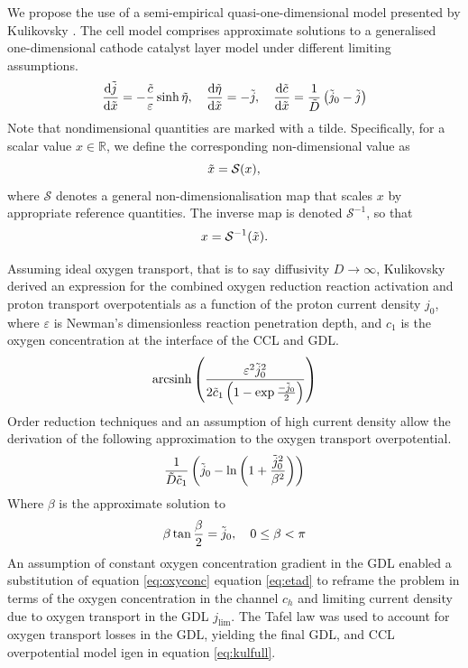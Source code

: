 We propose the use of a semi-empirical quasi-one-dimensional model presented by Kulikovsky \cite{kulikovskyPhysicallyBasedAnalytical2013a}.
The cell model comprises approximate solutions to a generalised one-dimensional cathode catalyst layer model under different limiting assumptions.
\begin{equation}
	\frac{\text{d} \tilde{j}}{\text{d} \tilde{x}}      = -\frac{\tilde{c}}{\varepsilon}\sinh{\tilde{\eta}}, \quad
	\frac{\text{d} \tilde{\eta}}{\text{d} \tilde{x}}  = -\tilde{j}, \quad
	\frac{\text{d} \tilde{c}}{\text{d} \tilde{x}}      = \frac{1}{\tilde{D}}\left(\tilde{j}_0 - \tilde{j}\right)
\end{equation}
Note that nondimensional quantities are marked with a tilde. Specifically, for a scalar value \( x \in \mathbb{R} \), we define the corresponding non-dimensional value as
\[
	\tilde{x} = \mathcal{S}(x),
\]
where \( \mathcal{S} \) denotes a general non-dimensionalisation map that scales \( x \) by appropriate reference quantities. The inverse map is denoted \( \mathcal{S}^{-1} \), so that
\[
	x = \mathcal{S}^{-1}(\tilde{x}).
\]

Assuming ideal oxygen transport, that is to say diffusivity $D \rightarrow \infty$, Kulikovsky derived an expression for the combined oxygen reduction reaction activation and proton transport overpotentials as a function of the proton current density $j_0$, where $\varepsilon$ is Newman's dimensionless reaction penetration depth, and $c_1$ is the oxygen concentration at the interface of the CCL and GDL.
\begin{equation}
	\text{arcsinh}\left(\frac{\varepsilon^2 \tilde{j}_0^2}{2 \tilde{c}_1 \left(1 - \exp{\frac{-\tilde{j}_0}{2}}\right)}\right) \label{eq:eta}
\end{equation}
Order reduction techniques and an assumption of high current density allow the derivation of the following approximation to the oxygen transport overpotential.
\begin{equation}
	\frac{1}{\tilde{D}\tilde{c}_1}\left(\tilde{j}_0 - \ln\left(1 + \frac{\tilde{j}_0^2}{\beta^2}\right)\right) \label{eq:etad}
\end{equation}
Where $\beta$ is the approximate solution to
\begin{equation}
	\beta \tan{\frac{\beta}{2}} = \tilde{j}_0, \quad 0 \le \beta < \pi
\end{equation}
An assumption of constant oxygen concentration gradient in the GDL enabled a substitution of equation \ref{eq:oxyconc} equation \ref{eq:etad} to reframe the problem in terms of the oxygen concentration in the channel $c_h$ and limiting current density due to oxygen transport in the GDL $j_{\text{lim}}$. The Tafel law was used to account for oxygen transport losses in the GDL, yielding the final GDL, and CCL overpotential model igen in equation \ref{eq:kulfull}.

